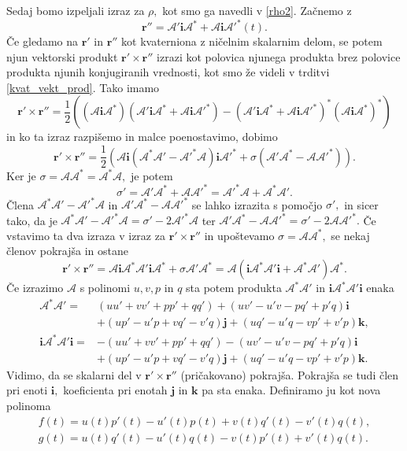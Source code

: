 \documentclass[12pt,a4paper,twoside]{article}
\theoremstyle{definition} %
\theoremstyle{plain} %
\theoremstyle{primerstyle}
\numberwithin{equation}{section}  %
\newcommand{\rV}{\mathbf{r}}
\newcommand{\iV}{\mathbf{i}}
\newcommand{\jV}{\mathbf{j}}
\newcommand{\kV}{\mathbf{k}}
\newcommand{\AQ}{\mathcal{A}}
\begin{document}
Sedaj bomo izpeljali izraz za $\rho,$ kot smo ga navedli v \eqref{rho2}. Začnemo z $$\rV''=\AQ'\iV\AQ^*+\AQ\iV\AQ'^*(t).$$ Če gledamo na $\rV'$ in $\rV''$ kot kvaterniona z ničelnim skalarnim delom, se potem njun vektorski produkt $\rV'\times\rV''$ izrazi kot polovica njunega produkta brez polovice produkta njunih konjugiranih vrednosti, kot smo že videli v trditvi \ref{kvat_vekt_prod}. Tako imamo
\begin{equation*}
	\rV'\times\rV''=\frac{1}{2}\left ( (\AQ\iV\AQ^*)(\AQ'\iV\AQ^*+\AQ\iV\AQ'^*)-(\AQ'\iV\AQ^*+\AQ\iV\AQ'^*)^*(\AQ\iV\AQ^*)^* \right )
\end{equation*}
in ko ta izraz razpišemo in malce poenostavimo, dobimo
\begin{equation*}
	\rV'\times\rV''=\frac{1}{2}\left ( \AQ\iV(\AQ^*\AQ'-\AQ'^*\AQ)\iV\AQ'^*+\sigma(\AQ'\AQ^*-\AQ\AQ'^*) \right ).
\end{equation*}
Ker je $\sigma=\AQ\AQ^*=\AQ^*\AQ,$ je potem
\begin{equation*}
	\sigma'=\AQ'\AQ^*+\AQ\AQ'^*=\AQ'^*\AQ+\AQ^*\AQ'.
\end{equation*}
Člena $\AQ^*\AQ'-\AQ'^*\AQ$ in $\AQ'\AQ^*-\AQ\AQ'^*$ se lahko izrazita s pomočjo $\sigma',$ in sicer tako, da je $\AQ^*\AQ'-\AQ'^*\AQ=\sigma'-2\AQ'^*\AQ$ ter $\AQ'\AQ^*-\AQ\AQ'^*=\sigma'-2\AQ\AQ'^*.$ Če vstavimo ta dva izraza v izraz za $\rV'\times\rV''$ in upoštevamo $\sigma=\AQ\AQ^*,$ se nekaj členov pokrajša in ostane
\begin{equation*}
	\rV'\times\rV''=\AQ\iV\AQ^*\AQ'\iV\AQ^* + \sigma\AQ'\AQ^*=\AQ(\iV\AQ^*\AQ'\iV + \AQ^*\AQ')\AQ^*.
\end{equation*}
Če izrazimo $\AQ$ s polinomi $u,v,p$ in $q$ sta potem produkta $\AQ^*\AQ'$ in $\iV\AQ^*\AQ'\iV$ enaka
\begin{align*}
	\AQ^*\AQ'=&(uu'+vv'+pp'+qq')+(uv'-u'v-pq'+p'q)\iV \\
	&+(up'-u'p+vq'-v'q)\jV+(uq'-u'q-vp'+v'p)\kV, \\
	\iV\AQ^*\AQ'\iV=&-(uu'+vv'+pp'+qq')-(uv'-u'v-pq'+p'q)\iV \\
	&+(up'-u'p+vq'-v'q)\jV+(uq'-u'q-vp'+v'p)\kV.
\end{align*}
Vidimo, da se skalarni del v $\rV'\times\rV''$ (pričakovano) pokrajša. Pokrajša se tudi člen pri enoti $\iV,$ koeficienta pri enotah $\jV$ in $\kV$ pa sta enaka. Definiramo ju kot nova polinoma
\begin{align}
	f(t)=u(t)p'(t)-u'(t)p(t)+v(t)q'(t)-v'(t)q(t), \nonumber \\
	g(t)=u(t)q'(t)-u'(t)q(t)-v(t)p'(t)+v'(t)q(t). \label{polinoma_f_g}
\end{align}
\end{document}

